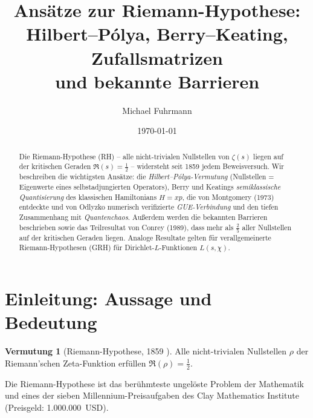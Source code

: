 \documentclass[12pt,a4paper]{amsart}
\theoremstyle{definition}
\newtheorem{conjecture}[theorem]{Vermutung}
\begin{document}

\title{Ans\"atze zur Riemann-Hypothese:\\
       Hilbert--P\'olya, Berry--Keating, Zufallsmatrizen\\
       und bekannte Barrieren}

\author{Michael Fuhrmann}
\address{Specialist Mathematics Project, Build 84}
\date{\today}

\begin{abstract}
Die Riemann-Hypothese (RH) -- alle nicht-trivialen Nullstellen von $\zeta(s)$
liegen auf der kritischen Geraden $\Re(s) = \tfrac{1}{2}$ -- widersteht
seit 1859 jedem Beweisversuch.
Wir beschreiben die wichtigsten Ans\"atze:
die \emph{Hilbert--P\'olya-Vermutung} (Nullstellen = Eigenwerte eines
selbstadjungierten Operators),
Berry und Keatings \emph{semiklassische Quantisierung} des klassischen
Hamiltonians $H = xp$,
die von Montgomery (1973) entdeckte und von Odlyzko numerisch verifi\-zierte
\emph{GUE-Verbindung} und den tiefen Zusammenhang mit
\emph{Quantenchaos}.
Au\ss erdem werden die bekannten Barrieren beschrieben sowie das
Teilresultat von Conrey (1989), dass mehr als $\tfrac{2}{5}$ aller
Nullstellen auf der kritischen Geraden liegen.
Analoge Resultate gelten für verallgemeinerte Riemann-Hypothesen (GRH)
für Dirichlet-$L$-Funktionen $L(s,\chi)$.
\end{abstract}

\maketitle
\tableofcontents

\section{Einleitung: Aussage und Bedeutung}

\begin{conjecture}[Riemann-Hypothese, 1859 \cite{Riemann1859}]
\label{conj:rh}
Alle nicht-trivialen Nullstellen $\rho$ der Riemann'schen Zeta-Funktion
erf\"ullen $\Re(\rho) = \tfrac{1}{2}$.
\end{conjecture}

Die Riemann-Hypothese ist das ber\"uhmteste ungel\"oste Problem der Mathematik
und eines der sieben Millennium-Preisaufgaben des Clay Mathematics Institute
(Preisgeld: 1.000.000~USD).
\end{document}
